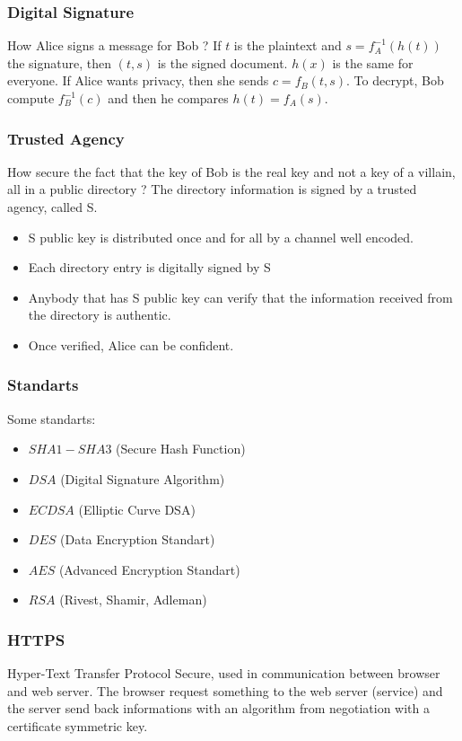 \documentclass{article}
\begin{document}
\subsubsection{Digital Signature} How Alice signs a message for Bob ? If $ t $ is the plaintext and $ s = f^{-1}_{A}(h(t)) $ the signature, then $ (t,s) $ is the signed document. $ h(x) $ is the same for everyone. If Alice wants privacy, then she sends $ c = f_B(t,s) $. To decrypt, Bob compute $ f^{-1}_{B}(c) $ and then he compares $ h(t) = f_A(s) $.

\subsubsection{Trusted Agency} How secure the fact that the key of Bob is the real key and not a key of a villain, all in a public directory ? The directory information is signed by a trusted agency, called S.
\begin{itemize}
\item S public key is distributed once and for all by a channel well encoded.
\item Each directory entry is digitally signed by S
\item Anybody that has S public key can verify that the information received from the directory is authentic.
\item Once verified, Alice can be confident.
\end{itemize}  

\subsubsection{Standarts} Some standarts:
\begin{itemize}
\item $ SHA1-SHA3 $ (Secure Hash Function)
\item $ DSA $ (Digital Signature Algorithm)
\item $ ECDSA $ (Elliptic Curve DSA)
\item $ DES $ (Data Encryption Standart)
\item $ AES $ (Advanced Encryption Standart)
\item $ RSA $ (Rivest, Shamir, Adleman)
\end{itemize}

\subsubsection{HTTPS} Hyper-Text Transfer Protocol Secure, used in communication between browser and web server. The browser request something to the web server (service) and the server send back informations with an algorithm from negotiation with a certificate symmetric key.
\end{document}
